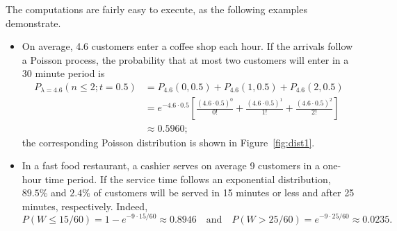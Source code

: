 The computations are fairly easy to execute, as the following examples demonstrate.
\begin{itemize}
\item On average, 4.6 customers enter a coffee shop each hour. If the arrivals follow a Poisson process, the probability that at most two customers will enter in a 30 minute period is \begin{align*}P_{\lambda=4.6}(n\leq 2;t=0.5)&=P_{4.6}(0,0.5)+P_{4.6}(1,0.5)+P_{4.6}(2,0.5) \\ &=e^{-4.6\cdot 0.5}\left[\frac{(4.6\cdot 0.5)^0}{0!}+\frac{(4.6\cdot 0.5)^1}{1!}+\frac{(4.6\cdot 0.5)^2}{2!}\right] \\ &\approx 0.5960; \end{align*} the corresponding Poisson distribution is shown in Figure~\ref{fig:dist1}. 
\item In a fast food restaurant, a cashier serves on average 9 customers in a one-hour time period. If the service time follows an exponential distribution, $89.5\%$ and $2.4\%$ of customers will be served in 15 minutes or less and after 25 minutes, respectively. Indeed, $$P(W\leq 15/60)=1-e^{-9 \cdot 15/60} \approx 0.8946\quad\text{and}\quad P(W>25/60)=e^{-9\cdot 25/60}\approx 0.0235.$$	
\end{itemize}

